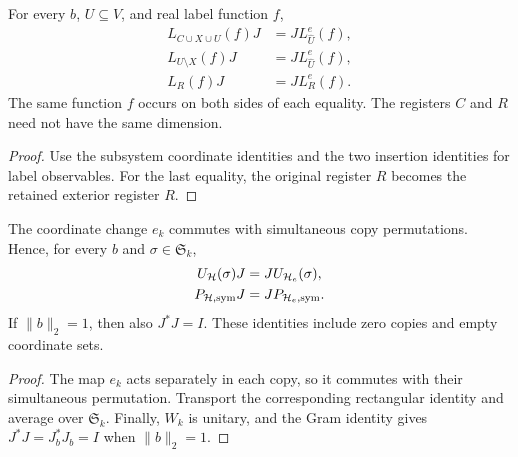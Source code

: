 \begin{theorem}
    \label{thm:bell_insertion_label_intertwining}
    \leanok
    For every $b$, $U\subseteq V$, and real label function $f$,
    \begin{align*}
        L_{C\cup X\cup U}(f)J&=J L^e_{\widehat U}(f),\\
        L_{U\setminus X}(f)J&=J L^e_{\widehat U}(f),\\
        L_R(f)J&=J L^e_R(f).
    \end{align*}
    The same function $f$ occurs on both sides of each equality.
    The registers $C$ and $R$ need not have the same dimension.
\end{theorem}
\begin{proof}\leanok
    Use the subsystem coordinate identities and the two insertion
    identities for label observables. For the last equality, the
    original register $R$ becomes the retained exterior register $R$.
\end{proof}

\begin{theorem}
    \label{thm:bell_insertion_isometry_symmetry}
    \leanok
    The coordinate change $e_k$ commutes with simultaneous copy
    permutations. Hence, for every $b$ and $\sigma\in\mathfrak S_k$,
    \begin{align*}
        U_{\mathcal H}(\sigma)J&=J U_{\mathcal H_e}(\sigma),\\
        P_{\mathcal H,{\rm sym}}J&=J P_{\mathcal H_e,{\rm sym}}.
    \end{align*}
    If $\|b\|_2=1$, then also $J^*J=I$.
    These identities include zero copies and empty coordinate sets.
\end{theorem}
\begin{proof}\leanok
    The map $e_k$ acts separately in each copy, so it commutes with
    their simultaneous permutation. Transport the corresponding
    rectangular identity and average over $\mathfrak S_k$.
    Finally, $W_k$ is unitary, and the Gram identity gives
    $J^*J=J_b^*J_b=I$ when $\|b\|_2=1$.
\end{proof}
